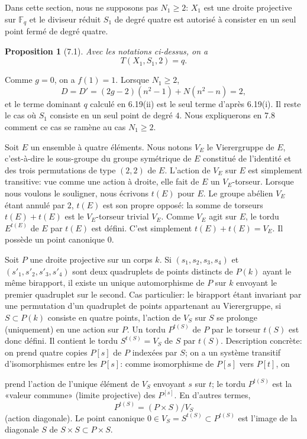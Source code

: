 \documentclass[10pt]{article}
\newcommand{\Fq}{\mathbb F_q}
\theoremstyle{deligne}
\newtheorem*{proposition*}{Proposition}
\newcommand{\heading}[1]{\vspace{0.7em}\noindent{\bfseries #1}\quad}
\begin{document}
Dans cette section, nous ne supposons pas $N_1\ge2$: $X_1$ est une droite projective sur $\Fq$ et le diviseur réduit $S_1$ de degré quatre est autorisé à consister en un seul point fermé de degré quatre.

\begin{proposition*}[7.1]
Avec les notations ci-dessus, on a
\begin{equation}\tag{7.1.1}
T(X_1,S_1,2)=q.
\end{equation}
\end{proposition*}

Comme $g=0$, on a $f(1)=1$. Lorsque $N_1\ge2$,
\[
D=D'=(2g-2)(n^2-1)+N(n^2-n)=2,
\]
et le terme dominant $q$ calculé en 6.19(ii) est le seul terme d'après 6.19(i). Il reste le cas où $S_1$ consiste en un seul point de degré $4$. Nous expliquerons en 7.8 comment ce cas se ramène au cas $N_1\ge2$.

\heading{7.2.} Soit $E$ un ensemble à quatre éléments. Nous notons $V_E$ le Vierergruppe de $E$, c'est-à-dire le sous-groupe du groupe symétrique de $E$ constitué de l'identité et des trois permutations de type $(2,2)$ de $E$. L'action de $V_E$ sur $E$ est simplement transitive: vue comme une action à droite, elle fait de $E$ un $V_E$-torseur. Lorsque nous voulons le souligner, nous écrivons $t(E)$ pour $E$. Le groupe abélien $V_E$ étant annulé par $2$, $t(E)$ est son propre opposé: la somme de torseurs $t(E)+t(E)$ est le $V_E$-torseur trivial $V_E$. Comme $V_E$ agit sur $E$, le tordu $E^{t(E)}$ de $E$ par $t(E)$ est défini. C'est simplement $t(E)+t(E)=V_E$. Il possède un point canonique $0$.

\heading{7.3.} Soit $P$ une droite projective sur un corps $k$. Si $(s_1,s_2,s_3,s_4)$ et $(s'_1,s'_2,s'_3,s'_4)$ sont deux quadruplets de points distincts de $P(k)$ ayant le même birapport, il existe un unique automorphisme de $P$ sur $k$ envoyant le premier quadruplet sur le second. Cas particulier: le birapport étant invariant par une permutation d'un quadruplet de points appartenant au Vierergruppe, si $S\subset P(k)$ consiste en quatre points, l'action de $V_S$ sur $S$ se prolonge (uniquement) en une action sur $P$. Un tordu $P^{t(S)}$ de $P$ par le torseur $t(S)$ est donc défini. Il contient le tordu $S^{t(S)}=V_S$ de $S$ par $t(S)$. Description concrète: on prend quatre copies $P[s]$ de $P$ indexées par $S$; on a un système transitif d'isomorphismes entre les $P[s]$: comme isomorphisme de $P[s]$ vers $P[t]$, on


prend l'action de l'unique élément de $V_S$ envoyant $s$ sur $t$; le tordu $P^{t(S)}$ est la «valeur commune» (limite projective) des $P^{[s]}$. En d'autres termes,
\[
P^{t(S)}=(P\times S)/V_S
\]
(action diagonale). Le point canonique $0\in V_S=S^{t(S)}\subset P^{t(S)}$ est l'image de la diagonale $S$ de $S\times S\subset P\times S$.
\end{document}
